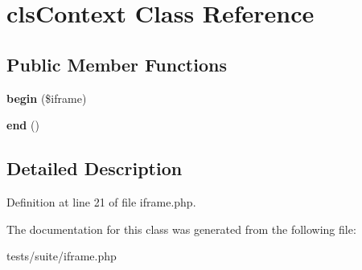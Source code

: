 \hypertarget{classclsContext}{
\section{clsContext Class Reference}
\label{classclsContext}
}
\subsection*{Public Member Functions}
\begin{DoxyCompactItemize}
\item 
\hypertarget{classclsContext_a0b388254bf1481854c7d463c3f3cafcc}{
{\bfseries begin} (\$iframe)}
\label{classclsContext_a0b388254bf1481854c7d463c3f3cafcc}

\item 
\hypertarget{classclsContext_a43bab5d06b8186e66c843069d3810738}{
{\bfseries end} ()}
\label{classclsContext_a43bab5d06b8186e66c843069d3810738}

\end{DoxyCompactItemize}


\subsection{Detailed Description}


Definition at line 21 of file iframe.php.



The documentation for this class was generated from the following file:\begin{DoxyCompactItemize}
\item 
tests/suite/iframe.php\end{DoxyCompactItemize}
